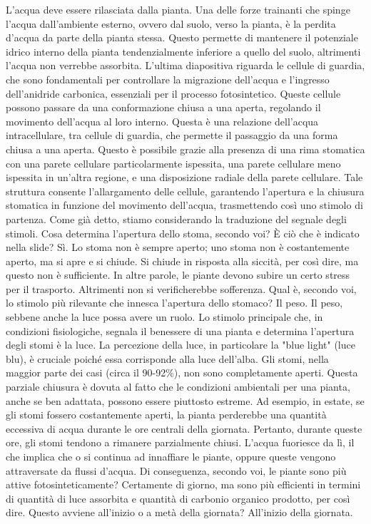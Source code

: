 \documentclass[11pt, a4paper]{article}
\begin{document}
\begin{spacing}{1}
L'acqua deve essere rilasciata dalla pianta. Una delle forze trainanti che spinge l'acqua dall'ambiente esterno, ovvero dal suolo, verso la pianta, è la perdita d'acqua da parte della pianta stessa. Questo permette di mantenere il potenziale idrico interno della pianta tendenzialmente inferiore a quello del suolo, altrimenti l'acqua non verrebbe assorbita. L'ultima diapositiva riguarda le cellule di guardia, che sono fondamentali per controllare la migrazione dell'acqua e l'ingresso dell'anidride carbonica, essenziali per il processo fotosintetico. Queste cellule possono passare da una conformazione chiusa a una aperta, regolando il movimento dell'acqua al loro interno. Questa è una relazione dell'acqua intracellulare, tra cellule di guardia, che permette il passaggio da una forma chiusa a una aperta. Questo è possibile grazie alla presenza di una rima stomatica con una parete cellulare particolarmente ispessita, una parete cellulare meno ispessita in un'altra regione, e una disposizione radiale della parete cellulare. Tale struttura consente l'allargamento delle cellule, garantendo l'apertura e la chiusura stomatica in funzione del movimento dell'acqua, trasmettendo così uno stimolo di partenza.
Come già detto, stiamo considerando la traduzione del segnale degli stimoli. Cosa determina l'apertura dello stoma, secondo voi? È ciò che è indicato nella slide? Sì. Lo stoma non è sempre aperto; uno stoma non è costantemente aperto, ma si apre e si chiude. Si chiude in risposta alla siccità, per così dire, ma questo non è sufficiente. In altre parole, le piante devono subire un certo stress per il trasporto.
Altrimenti non si verificherebbe sofferenza. Qual è, secondo voi, lo stimolo più rilevante che innesca l'apertura dello stomaco? Il peso. Il peso, sebbene anche la luce possa avere un ruolo.
Lo stimolo principale che, in condizioni fisiologiche, segnala il benessere di una pianta e determina l'apertura degli stomi è la luce. La percezione della luce, in particolare la "blue light" (luce blu), è cruciale poiché essa corrisponde alla luce dell'alba. Gli stomi, nella maggior parte dei casi (circa il 90-92\%), non sono completamente aperti. Questa parziale chiusura è dovuta al fatto che le condizioni ambientali per una pianta, anche se ben adattata, possono essere piuttosto estreme. Ad esempio, in estate, se gli stomi fossero costantemente aperti, la pianta perderebbe una quantità eccessiva di acqua durante le ore centrali della giornata. Pertanto, durante queste ore, gli stomi tendono a rimanere parzialmente chiusi.
L'acqua fuoriesce da lì, il che implica che o si continua ad innaffiare le piante, oppure queste vengono attraversate da flussi d'acqua. Di conseguenza, secondo voi, le piante sono più attive fotosinteticamente? Certamente di giorno, ma sono più efficienti in termini di quantità di luce assorbita e quantità di carbonio organico prodotto, per così dire. Questo avviene all'inizio o a metà della giornata? All'inizio della giornata.

\end{spacing}
\end{document}
